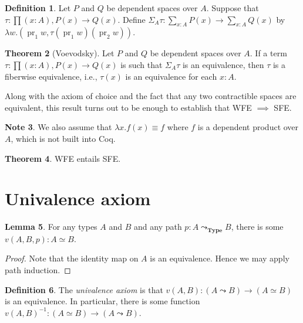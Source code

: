 \documentclass[10pt,letterpaper,cm]{nupset}
\theoremstyle{definition}
\newtheorem{definition}{Definition}[subsection]
\newtheorem{note}[definition]{Note}
\theoremstyle{theorem}
\newtheorem{theorem}[definition]{Theorem}
\newtheorem{lemma}[definition]{Lemma}
\theoremstyle{remark}
\newcommand{\1}{\mathbf{1}}
\newcommand{\0}{\vec 0}
\DeclareMathOperator{\pr}{pr}
\DeclareMathOperator{\type}{\mathbf{Type}}
\begin{document}
\begin{definition}
Let $P$ and $Q$ be dependent spaces over $A$. Suppose that $\tau : \prod(x:A), P(x) \to Q(x)$. Define $\Sigma_A\tau : \sum_{x:A}P(x) \to \sum_{x:A} Q(x)$ by $\lambda w. (\pr_1 w, \tau(\pr_1w)(\pr_2w))$.
\end{definition}

\begin{theorem}[Voevodsky]
Let $P$ and $Q$ be dependent spaces over $A$. If a term $\tau : \prod(x:A), P(x) \to Q(x)$ is such that $\Sigma_A \tau$ is an equivalence, then $\tau$ is a fiberwise equivalence, i.e., $\tau(x)$ is an equivalence for each $x:A$. 
\end{theorem}

Along with the axiom of choice and the fact that any two contractible spaces are equivalent, this result turns out to be enough to establish that WFE $\implies$ SFE.

\begin{note}
We also assume that $\lambda x. f(x) \equiv f$ where $f$ is a dependent product over $A$, which is not built into Coq.
\end{note}

\begin{theorem}
WFE entails SFE.
\end{theorem}


\section{Univalence axiom}

\begin{lemma}
For any types $A$ and $B$ and any path $p: A \leadsto_{\type} B$, there is some $v(A, B, p) : A \simeq B$.  
\end{lemma}
\begin{proof}
Note that the identity map on $A$ is an equivalence. Hence we may apply path induction. 
\end{proof}

\begin{definition}
The \textit{univalence axiom} is that $v(A, B) : (A \leadsto B) \to (A \simeq B)$ is an equivalence. In particular, there is some function $v(A, B) ^{{-}1}: (A \simeq B) \to (A \leadsto B)$.
\end{definition}
\end{document}
